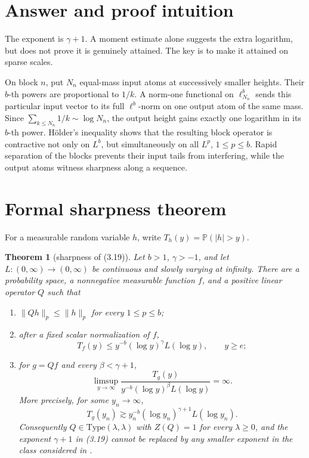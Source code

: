 \documentclass[11pt]{article}
\newtheorem{theorem}{Theorem}
\newcommand{\Pp}{\mathbb P}
\newcommand{\Tp}[1]{T_{#1}}
\begin{document}
\section{Answer and proof intuition}

The exponent is \(\gamma+1\).  A moment estimate alone suggests the extra
logarithm, but does not prove it is genuinely attained.  The key is to make it
attained on sparse scales.

On block \(n\), put \(N_n\) equal-mass input atoms at successively smaller
heights.  Their \(b\)-th powers are proportional to \(1/k\).  A norm-one
functional on \(\ell^b_{N_n}\) sends this particular input vector to its full
\(\ell^b\)-norm on one output atom of the same mass.  Since
\(\sum_{k\le N_n}1/k\sim\log N_n\), the output height gains exactly one
logarithm in its \(b\)-th power.  Hölder's inequality shows that the resulting
block operator is contractive not only on \(L^b\), but simultaneously on all
\(L^p\), \(1\le p\le b\).  Rapid separation of the blocks prevents their
input tails from interfering, while the output atoms witness sharpness along
a sequence.

\section{Formal sharpness theorem}

For a measurable random variable \(h\), write
\(\Tp h(y)=\Pp(|h|>y)\).

\begin{theorem}[sharpness of (3.19)]\label{thm:sharp}
Let \(b>1\), \(\gamma>-1\), and let \(L:(0,\infty)\to(0,\infty)\) be
continuous and slowly varying at infinity.  There are a probability space,
a nonnegative measurable function \(f\), and a positive linear operator \(Q\)
such that
\begin{enumerate}
\item \(\|Qh\|_p\le \|h\|_p\) for every \(1\le p\le b\);
\item after a fixed scalar normalization of \(f\),
\[
 \Tp f(y)\le y^{-b}(\log y)^\gamma L(\log y),\qquad y\ge e;
\]
\item for \(g=Qf\) and every \(\beta<\gamma+1\),
\[
 \limsup_{y\to\infty}
 \frac{\Tp g(y)}{y^{-b}(\log y)^\beta L(\log y)}=\infty.
\]
More precisely, for some \(y_n\to\infty\),
\[
 \Tp g(y_n)\gtrsim
 y_n^{-b}(\log y_n)^{\gamma+1}L(\log y_n).
\]
Consequently \(Q\in\mathrm{Type}(\lambda,\lambda)\) with \(Z(Q)=1\) for
every \(\lambda\ge0\), and the exponent \(\gamma+1\) in (3.19) cannot be
replaced by any smaller exponent in the class considered in \cite{OS}.
\end{enumerate}
\end{theorem}
\end{document}
